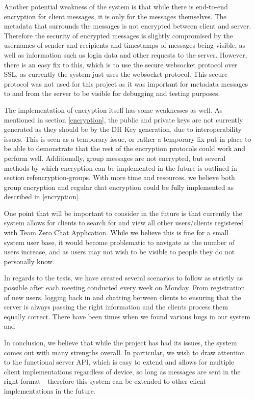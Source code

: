 Another potential weakness of the system is that while there is end-to-end encryption for client messages, it is only for the messages themselves. The metadata that surrounds the messages is not encrypted between client and server. Therefore the security of encrypted messages is slightly compromised by the usernames of sender and recipients and timestamps of messages being visible, as well as information such as login data and other requests to the server. However, there is an easy fix to this, which is to use the secure websocket protocol over SSL, as currently the system just uses the websocket protocol. This secure protocol was not used for this project as it was important for metadata messages to and from the server to be visible for debugging and testing purposes.


The implementation of encryption itself has some weaknesses as well. As mentioned in section \ref{encryption}, the public and private keys are not currently generated as they should be by the DH Key generation, due to interoperability issues. This is seen as a temporary issue, or rather a temporary fix put in place to be able to demonstrate that the rest of the encryption protocols could work and perform well. Additionally, group messages are not encrypted, but several methods by which encryption can be implemented in the future is outlined in section ref{encryption-groups}. With more time and resources, we believe both group encryption and regular chat encryption could be fully implemented as described in \ref{encryption}.

One point that will be important to consider in the future is that currently the system allows for clients to search for and view all other users/clients registered with Team Zero Chat Application. While we believe this is fine for a small system user base, it would become problematic to navigate as the number of users increase, and as users may not wish to be visible to people they do not personally know. 

In regards to the tests, we have created several scenarios to follow as strictly as possible after each meeting conducted every week on Monday. From registration of new users, logging back in and chatting between clients to ensuring that the server is always passing the right information and the clients process them equally correct. There have been times when we found various bugs in our system and 

In conclusion, we believe that while the project has had its issues, the system comes out with many strengths overall. In particular, we wish to draw attention to the functional server API, which is easy to extend and allows for multiple client implementations regardless of device, so long as messages are sent in the right format - therefore this system can be extended to other client implementations in the future. 
